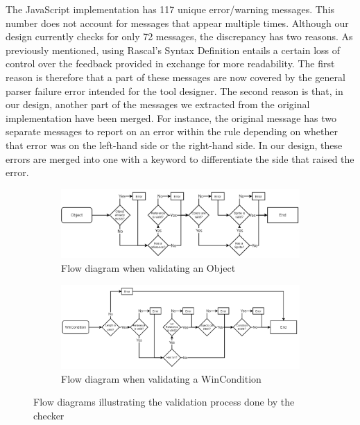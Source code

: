 The JavaScript implementation has 117 unique error/warning messages. This number does not account for messages that appear multiple times. Although our design currently checks for only 72 messages, the discrepancy has two reasons. As previously mentioned, using Rascal's Syntax Definition entails a certain loss of control over the feedback provided in exchange for more readability. The first reason is therefore that a part of these messages are now covered by the general parser failure error intended for the tool designer. The second reason is that, in our design, another part of the messages we extracted from the original implementation have been merged\dd. For instance, the original message has two separate messages to report on an error within the rule depending on whether that error was on the left-hand side or the right-hand side. In our design, these errors are merged into one with a keyword to differentiate the side that raised the error.

\begin{figure}[!t]
    \centering
    \begin{subfigure}{1\textwidth}
        \includegraphics[scale=0.45]{images/checker/Object.png}
        \caption{Flow diagram when validating an Object}
        \label{fig:checker_object}
    \end{subfigure}
    \begin{subfigure}{1\textwidth}
        \includegraphics[scale=0.45]{images/checker/WinCondition.png}
        \caption{Flow diagram when validating a WinCondition}
        \label{fig:checker_condition}
    \end{subfigure}
    \caption{Flow diagrams illustrating the validation process done by the checker}
\end{figure}

